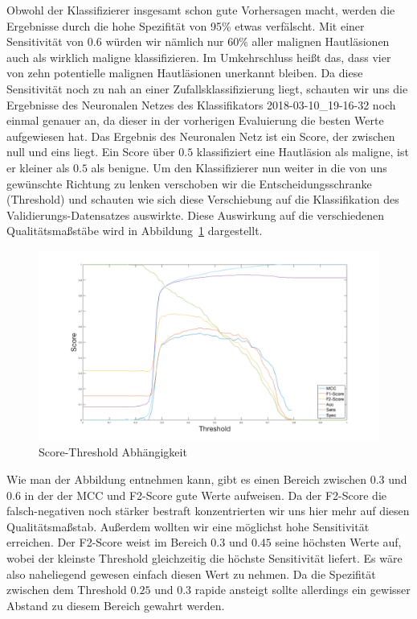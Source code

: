 Obwohl der Klassifizierer insgesamt schon gute Vorhersagen macht, werden die Ergebnisse durch die hohe Spezifität von 95\% etwas verfälscht. Mit einer Sensitivität von $0.6$ würden wir nämlich nur $60\%$ aller malignen Hautläsionen auch als wirklich maligne klassifizieren. Im Umkehrschluss heißt das, dass vier von zehn potentielle malignen Hautläsionen unerkannt bleiben. Da diese Sensitivität noch zu nah an einer Zufallsklassifizierung liegt, schauten wir uns die Ergebnisse des Neuronalen Netzes des Klassifikators 2018-03-10\_19-16-32 noch einmal genauer an, da dieser in der vorherigen Evaluierung die besten Werte aufgewiesen hat. Das Ergebnis des Neuronalen Netz ist ein Score, der zwischen null und eins liegt. Ein Score über $0.5$ klassifiziert eine Hautläsion als maligne, ist er kleiner als $0.5$ als benigne. Um den Klassifizierer nun weiter in die von uns gewünschte Richtung zu lenken verschoben wir die Entscheidungsschranke (Threshold) und schauten wie sich diese Verschiebung auf die Klassifikation des Validierungs-Datensatzes auswirkte. Diese Auswirkung auf die verschiedenen Qualitätsmaßstäbe wird in Abbildung~\ref{fig:threshold} dargestellt. 

\begin{figure}[htb!]
	\begin{center}
		\includegraphics[width=\textwidth]{./pics/evaluation/treshold.png}
		\caption{Score-Threshold Abhängigkeit}
		\label{fig:threshold}
    \end{center}
\end{figure}

Wie man der Abbildung entnehmen kann, gibt es einen Bereich zwischen $0.3$ und $0.6$ in der der MCC und F2-Score gute Werte aufweisen. Da der F2-Score die falsch-negativen noch stärker bestraft konzentrierten wir uns hier mehr auf diesen Qualitätsmaßstab. Außerdem wollten wir eine möglichst hohe Sensitivität erreichen. Der F2-Score weist im Bereich $0.3$ und $0.45$ seine höchsten Werte auf, wobei der kleinste Threshold gleichzeitig die höchste Sensitivität liefert. Es wäre also naheliegend gewesen einfach diesen Wert zu nehmen. Da die Spezifität zwischen dem Threshold $0.25$ und $0.3$ rapide ansteigt sollte allerdings ein gewisser Abstand zu diesem Bereich gewahrt werden. 


